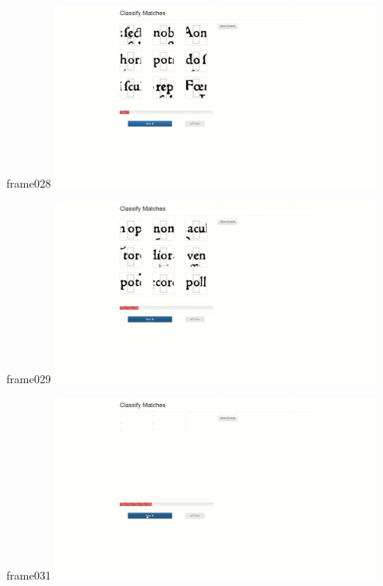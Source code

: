 \documentclass{beamer}
\begin{document}
\begin{frame}{frame028}
\includegraphics[width=0.8\textwidth]{output/exported-frames/frame028.png}
\note{}
\end{frame}

\begin{frame}{frame029}
\includegraphics[width=0.8\textwidth]{output/exported-frames/frame029.png}
\note{}
\end{frame}

\begin{frame}{frame031}
\includegraphics[width=0.8\textwidth]{output/exported-frames/frame031.png}
\note{}
\end{frame}
\end{document}

